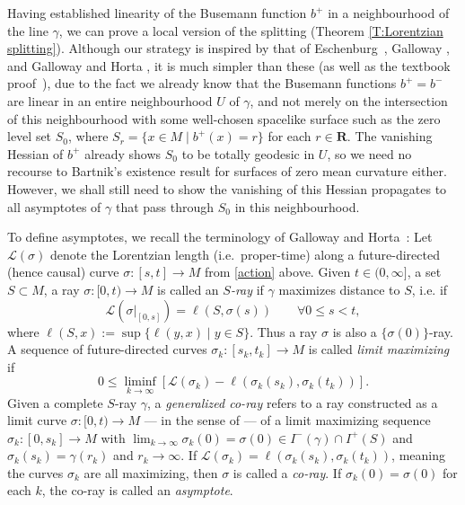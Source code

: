 \documentclass[12pt]{amsart}
\newcommand{\R}{{\mathbf R}}
\newcommand{\LL}{\mathcal{L}}
\newcommand{\gr}{\color{ForestGreen}}
\begin{document}
Having established linearity of the Busemann function $b^+$ in a neighbourhood of the line $\gamma$, we can prove a local version of the splitting (Theorem \ref{T:Lorentzian splitting}).
Although our strategy is inspired by %
that of Eschenburg~\cite{Eschenburg88},
Galloway \cite{Galloway89}, and Galloway and Horta \cite{GallowayHorta96},  it is {much simpler than} 
these (as well as the textbook 
proof~\cite{BeemEhrlichEasley96}),  due to the fact we already know that the Busemann functions $b^+=b^-$ %
are linear in an entire neighbourhood $U$ of $\gamma$,  and not merely on the intersection of this neighbourhood with some well-chosen spacelike surface such as the zero level set $S_0$, where $S_r = \{x \in M \mid b^+(x)=r\}$ for each $r \in \R$. 
The vanishing Hessian of $b^+$ already shows $S_0$ to be totally geodesic in $U$,  so we need no recourse to Bartnik's existence result for surfaces of zero mean curvature \cite{Bartnik88b} either.
However,  we shall still need to show the vanishing of this Hessian propagates to all asymptotes of $\gamma$ that pass through $S_0$ in this neighbourhood.

To define asymptotes, we recall the terminology of Galloway and Horta~\cite{GallowayHorta96}:
Let $\LL(\sigma)$ denote the {Lorentzian} length (i.e.\ proper-time) along a future-directed (hence causal) curve $\sigma:[s,t]\longrightarrow M$ 
from \eqref{action} above.
Given $t \in (0,\infty]$, a set $S\subset M$,  a ray $\sigma:[0,t) \longrightarrow M$ is called an {\em $S$-ray} if $\gamma$ maximizes distance to $S$, i.e. if 
$$
\LL(\sigma|_{[0,s]})=\ell(S,\sigma(s)) \qquad \forall 0 \le s <t,
$$
where $\ell(S,x) := \sup\{\ell(y,x) \mid y \in S\}$. Thus a ray $\sigma$ is also a $\{\sigma(0)\}$-ray.
A sequence of future-directed curves $\sigma_k:[s_k,t_k]\longrightarrow M$ is called {\em limit maximizing} if 
$$
0 \le \liminf_{k \to \infty} [\LL(\sigma_k) - \ell(\sigma_k(s_k),\sigma_k(t_k))].
$$
Given a complete $S$-ray $\gamma$,  
a {\em generalized co-ray}
refers to a ray constructed as a 
limit curve $\sigma:[0,t)\longrightarrow M$ 
--- in the sense of \cite{GallowayHorta96} ---  
of a limit maximizing sequence
$\sigma_k:[0,s_k] \longrightarrow M$ with $\lim_{k \to\infty}  \sigma_k(0)=\sigma(0) \in I^-(\gamma) \cap I^+(S)$ and $\sigma_k(s_k)=\gamma(r_k)$ and $r_k \to \infty$.
If  $\LL(\sigma_k) =  \ell(\sigma_k(s_k),\sigma_k(t_k))$, meaning the curves $\sigma_k$ are all maximizing, then $\sigma$ is called a {\em co-ray}.
If $\sigma_k(0)=\sigma(0)$ for each $k$, the co-ray is called an {\em asymptote}.  
\end{document}
